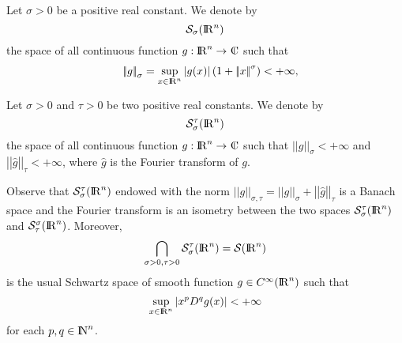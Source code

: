 \documentclass[12pt,a4paper]{amsart}
\begin{document}
{\begin{definition}
Let ${\sigma}>0$ be a positive real constant.
We denote by
\begin{equation}\nonumber
{{\mathcal{S}}_{\sigma}({{\rm I\kern-.185em R}}^{n})}
\end{equation}
the space of all continuous function
${g}:{{\rm I\kern-.185em R}}^{n}\to{{\rm\kern.37em\vrule height1.4ex width.05em depth-.011em\kern-.37em C}}$ such that
\begin{eqnarray}\nonumber
&&{{\left|\!\left|{g}\right|\!\right|}_{\sigma}}=
	\sup_{{x}\in{{\rm I\kern-.185em R}}^{n}}|{g}({x})|
	\left(1+{\left|\!\left|{x}\right|\!\right|}^{\sigma}\right)
<+\infty,
\end{eqnarray}
\end{definition}

\begin{definition}
Let ${\sigma}>0$ and ${\tau}>0$ be two positive real constants.
We denote by
\begin{equation}\nonumber
{{\mathcal{S}}_{\sigma}^{{\tau}}({{\rm I\kern-.185em R}}^{n})}
\end{equation}
the space of all continuous function
${g}:{{\rm I\kern-.185em R}}^{n}\to{{\rm\kern.37em\vrule height1.4ex width.05em depth-.011em\kern-.37em C}}$ such that
${{\left|\!\left|{g}\right|\!\right|}_{\sigma}}<+\infty$
and ${{\left|\!\left|{\hat{g}}\right|\!\right|}_{{\tau}}}<+\infty$,
where $\hat{g}$ is the Fourier transform of ${g}$.
\end{definition}

Observe that ${{\mathcal{S}}_{\sigma}^{{\tau}}({{\rm I\kern-.185em R}}^{n})}$ endowed with
the norm ${\left|\!\left|{g}\right|\!\right|}_{{\sigma},{\tau}}=
{{\left|\!\left|{g}\right|\!\right|}_{\sigma}}+{{\left|\!\left|{\hat{g}}\right|\!\right|}_{{\tau}}}$
is a Banach space
and the Fourier transform is an isometry between the two spaces
${{\mathcal{S}}_{\sigma}^{{\tau}}({{\rm I\kern-.185em R}}^{n})}$ and
${{\mathcal{S}}_{{\tau}}^{\sigma}({{\rm I\kern-.185em R}}^{n})}$.
Moreover,
\begin{equation}\nonumber
\bigcap_{{\sigma}>0, {\tau}>0}{{\mathcal{S}}_{\sigma}^{{\tau}}({{\rm I\kern-.185em R}}^{n})}
={\mathcal S}({{\rm I\kern-.185em R}}^{n})
\end{equation}
is the usual Schwartz space of smooth function ${g}\in C^{\infty}({{\rm I\kern-.185em R}}^{n})$
such that
\begin{equation}\nonumber
\sup_{{x}\in{{\rm I\kern-.185em R}}^{n}}{\left|{{x}^{p} D^{q}{g}({x})}\right|}<+\infty
\end{equation}
for each ${p},{q}\in{{\rm I\kern-.185em N}}^{n}$.

}
\end{document}
